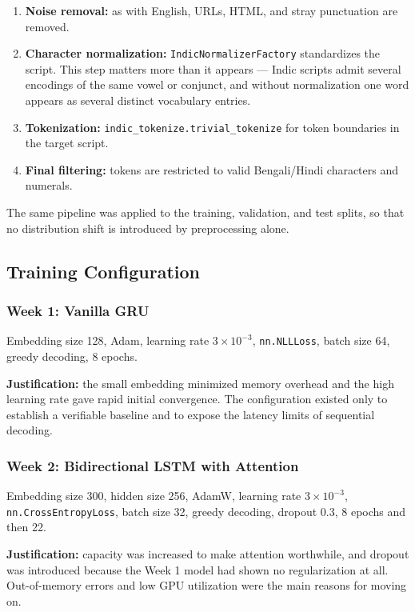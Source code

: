 \documentclass[11pt, oneside]{article}
\begin{document}
\begin{enumerate}
    \item \textbf{Noise removal:} as with English, URLs, HTML, and stray punctuation are
          removed.
    \item \textbf{Character normalization:} \texttt{IndicNormalizerFactory} standardizes the
          script. This step matters more than it appears --- Indic scripts admit several
          encodings of the same vowel or conjunct, and without normalization one word appears
          as several distinct vocabulary entries.
    \item \textbf{Tokenization:} \texttt{indic\_tokenize.trivial\_tokenize} for token
          boundaries in the target script.
    \item \textbf{Final filtering:} tokens are restricted to valid Bengali/Hindi characters
          and numerals.
\end{enumerate}

The same pipeline was applied to the training, validation, and test splits, so that no
distribution shift is introduced by preprocessing alone.

\subsection{Training Configuration}

\subsubsection{Week 1: Vanilla GRU}

Embedding size 128, Adam, learning rate $3 \times 10^{-3}$, \texttt{nn.NLLLoss}, batch size
64, greedy decoding, 8 epochs.

\textbf{Justification:} the small embedding minimized memory overhead and the high learning
rate gave rapid initial convergence. The configuration existed only to establish a verifiable
baseline and to expose the latency limits of sequential decoding.

\subsubsection{Week 2: Bidirectional LSTM with Attention}

Embedding size 300, hidden size 256, AdamW, learning rate $3 \times 10^{-3}$,
\texttt{nn.CrossEntropyLoss}, batch size 32, greedy decoding, dropout 0.3, 8 epochs and then
22.

\textbf{Justification:} capacity was increased to make attention worthwhile, and dropout was
introduced because the Week 1 model had shown no regularization at all. Out-of-memory errors
and low GPU utilization were the main reasons for moving on.
\end{document}
